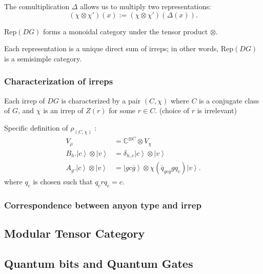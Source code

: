 The comultiplication $\Delta$ allows us to multiply two representations:
\[
	(\chi \otimes  \chi') (x) := (\chi \otimes \chi')(\Delta(x))
.\] 

$\text{Rep}(DG)$ forms a monoidal category under the tensor product $\otimes $.

Each representation is a unique direct sum of irreps; in other words, $\text{Rep}(DG)$ is a semisimple category.

\subsubsection{Characterization of irreps}

Each irrep of $DG$ is characterized by a pair $(C, \chi)$ where $C$ is a conjugate class of $G$, and $\chi$ is an irrep of $Z(r)$ for some $r \in C$. (choice of $r$ is irrelevant)

Specific definition of $\rho_{(C, \chi)}$ :
\begin{align*}
	V_\rho &= \mathbb{C}^{\otimes C} \otimes V_\chi \\
	B_h . \left| c \right\rangle \otimes \left| v \right\rangle 
	&= \delta_{h,c} \left| c \right\rangle \otimes \left| v \right\rangle  \\
	A_g . \left| c \right\rangle  \otimes \left| v \right\rangle 
	&= \left| g c \overline{g}  \right\rangle \otimes \chi\left( \overline{q} _{g c \overline{g} } g q_c \right) \left| v \right\rangle  
.\end{align*}
where $q_c$ is chosen such that $q_c r q_c = c$.


\subsubsection{Correspondence between anyon type and irrep}



\subsection{Modular Tensor Category}


\subsection{Quantum bits and Quantum Gates}







